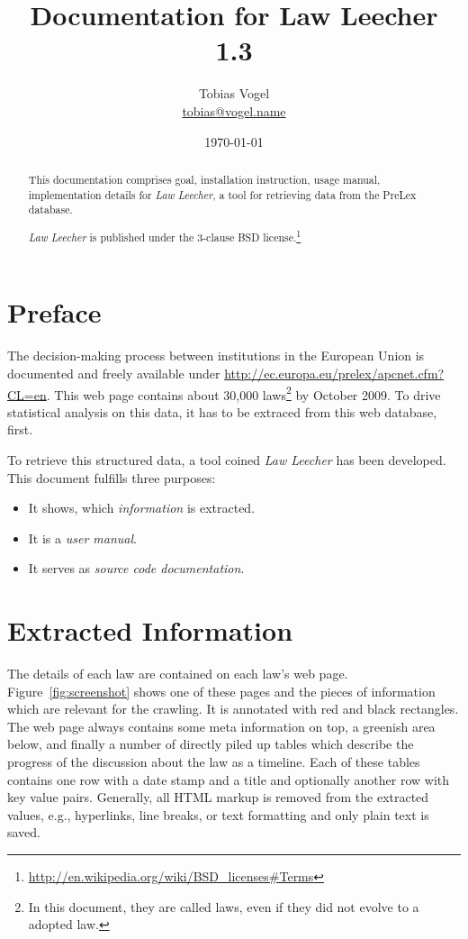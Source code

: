 \documentclass{scrartcl}
\newcommand{\theTitle}{Documentation for Law Leecher 1.3}
\newcommand{\theAuthor}{Tobias Vogel}
\begin{document}
\title{\theTitle}
\author{\theAuthor\\\url{tobias@vogel.name}}
\date{\today}

\maketitle

\begin{abstract}
This documentation comprises goal, installation instruction, usage manual, implementation details for \textit{Law Leecher}, a tool for retrieving data from the PreLex database.

\textit{Law Leecher} is published under the 3-clause BSD license.\footnote{\url{http://en.wikipedia.org/wiki/BSD_licenses\#Terms}}
\end{abstract}


\tableofcontents


\section{Preface}
The decision-making process between institutions in the European Union is documented and freely available under \url{http://ec.europa.eu/prelex/apcnet.cfm?CL=en}. This web page contains about 30,000 laws\footnote{In this document, they are called laws, even if they did not evolve to a adopted law.} by October 2009. To drive statistical analysis on this data, it has to be extraced from this web database, first.

To retrieve this structured data, a tool coined \textit{Law Leecher} has been developed. This document fulfills three purposes:

\begin{itemize}
\item It shows, which \textit{information} is extracted.
\item It is a \textit{user manual}.
\item It serves as \textit{source code documentation}.
\end{itemize}



\section{Extracted Information}
The details of each law are contained on each law's web page. Figure~\ref{fig:screenshot} shows one of these pages and the pieces of information which are relevant for the crawling. It is annotated with red and black rectangles. The web page always contains some meta information on top, a greenish area below, and finally a number of directly piled up tables which describe the progress of the discussion about the law as a timeline. Each of these tables contains one row with a date stamp and a title and optionally another row with key value pairs. Generally, all HTML markup is removed from the extracted values, e.g., hyperlinks, line breaks, or text formatting and only plain text is saved.
\end{document}
